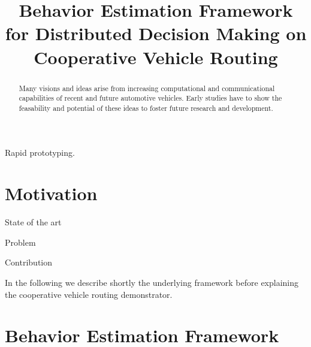 \documentclass[conference]{../cls/IEEEtran}
\begin{document}
\title{Behavior Estimation Framework for Distributed Decision Making on Cooperative Vehicle Routing}

\author{
	\and
}

\maketitle

\begin{abstract}
Many visions and ideas arise from increasing computational and communicational capabilities of recent and future automotive vehicles.
Early studies have to show the feasability and potential of these ideas to foster future research and development.
\end{abstract}

\begin{IEEEkeywords}
Rapid prototyping.
\end{IEEEkeywords}

\section{Motivation}

State of the art

Problem

Contribution

In the following we describe shortly the underlying framework before explaining the cooperative vehicle routing demonstrator.

\section{Behavior Estimation Framework}
\end{document}
